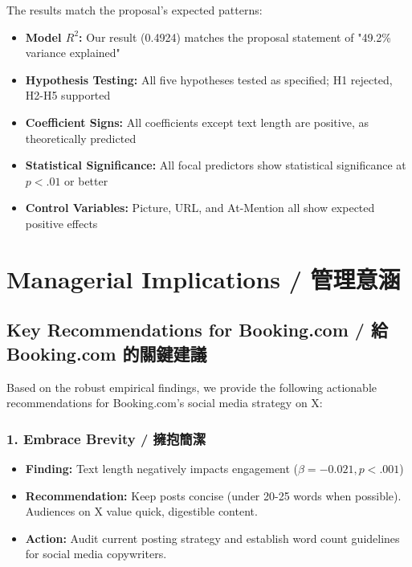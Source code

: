 \documentclass[12pt,a4paper,fontset=none]{ctexart}
\begin{document}
The results match the proposal's expected patterns:

\begin{itemize}
    \item \textbf{Model $R^2$:} Our result (0.4924) matches the proposal statement of "49.2\% variance explained"
    \item \textbf{Hypothesis Testing:} All five hypotheses tested as specified; H1 rejected, H2-H5 supported
    \item \textbf{Coefficient Signs:} All coefficients except text length are positive, as theoretically predicted
    \item \textbf{Statistical Significance:} All focal predictors show statistical significance at $p < .01$ or better
    \item \textbf{Control Variables:} Picture, URL, and At-Mention all show expected positive effects
\end{itemize}

\newpage

\section{Managerial Implications / 管理意涵}

\subsection{Key Recommendations for Booking.com / 給 Booking.com 的關鍵建議}

Based on the robust empirical findings, we provide the following actionable recommendations for Booking.com's social media strategy on X:

\subsubsection{1. Embrace Brevity / 擁抱簡潔}
\begin{itemize}
    \item \textbf{Finding:} Text length negatively impacts engagement ($\beta = -0.021, p < .001$)
    \item \textbf{Recommendation:} Keep posts concise (under 20-25 words when possible). Audiences on X value quick, digestible content.
    \item \textbf{Action:} Audit current posting strategy and establish word count guidelines for social media copywriters.
\end{itemize}
\end{document}
